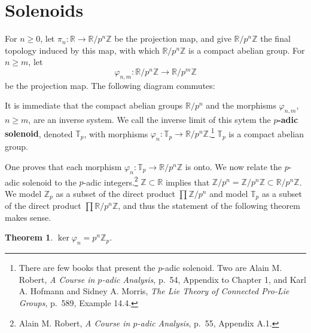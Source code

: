 \documentclass{article}
\newcommand{\id}{\ensuremath\mathrm{id}}
\newtheorem{theorem}{Theorem}
\theoremstyle{definition}
\begin{document}
 
 \section{Solenoids}
 For $n \geq 0$, let $\pi_n:\mathbb{R} \to \mathbb{R}/p^n \mathbb{Z}$ be the projection map, and give $\mathbb{R}/p^n \mathbb{Z}$ the final
 topology induced by this map, with which
$\mathbb{R}/p^n \mathbb{Z}$ is  a compact abelian group. 
 For $n \geq m$, let
 \[
 \varphi_{n,m}:\mathbb{R}/p^n \mathbb{Z} \to \mathbb{R}/p^m \mathbb{Z}
 \]
 be the projection map. The following diagram commutes:
 
 \begin{center}
\end{center}
 
It is immediate that the compact abelian groups $\mathbb{R}/p^n$ and the morphisms $\varphi_{n,m}$, $n \geq m$,
are an inverse system. We call the inverse limit of this sytem the \textbf{$p$-adic solenoid}, denoted
$\mathbb{T}_p$, with morphisms $\varphi_n:\mathbb{T}_p \to \mathbb{R}/p^n \mathbb{Z}$.\footnote{There are few books that present the $p$-adic solenoid. Two are Alain M. Robert, {\em A Course in $p$-adic Analysis}, p.~54, Appendix to Chapter 1, and
Karl A. Hofmann and Sidney A. Morris, {\em The Lie Theory of Connected Pro-Lie Groups}, p.~589, Example 14.4.}
$\mathbb{T}_p$ is a compact abelian group. 

One proves that each morphism $\varphi_n:\mathbb{T}_p \to \mathbb{R}/p^n \mathbb{Z}$ is onto. 
We now relate the $p$-adic solenoid to the $p$-adic integers.\footnote{Alain M. Robert, {\em A Course in $p$-adic Analysis}, p.~55, Appendix A.1.}
 $\mathbb{Z} \subset
 \mathbb{R}$ implies that $\mathbb{Z}/p^n = \mathbb{Z}/p^n \mathbb{Z} \subset
 \mathbb{R}/p^n\mathbb{Z}$. We model $\mathbb{Z}_p$ as a subset of the direct product
 $\prod \mathbb{Z}/p^n$ and model $\mathbb{T}_p$ as a subset of the direct product
 $\prod \mathbb{R}/p^n\mathbb{Z}$, and thus the statement of the following theorem makes sense.

\begin{theorem}
$\ker \varphi_n = p^n \mathbb{Z}_p$.
\end{theorem}
\end{document}
